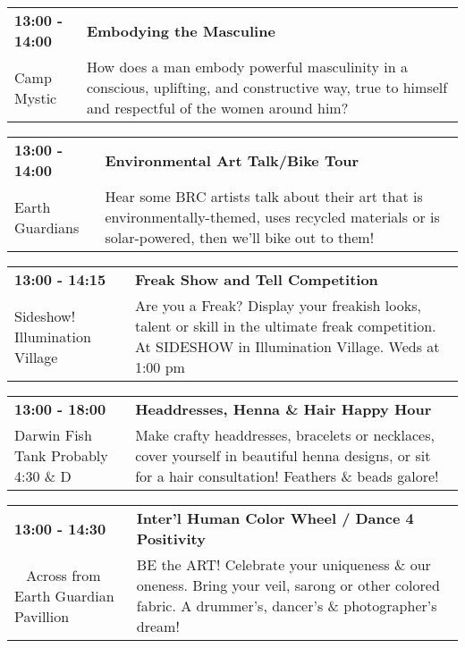 \begin{tabular}{ p{1in} p{2.2in} }
    \textbf{13:00 - 14:00} & \textbf{Embodying the Masculine} \\
    Camp Mystic \newline  & How does a man embody powerful masculinity in a conscious, uplifting, and constructive way, true to himself and respectful of the women around him? \\
    \hline 
\end{tabular}
    
\begin{tabular}{ p{1in} p{2.2in} }
    \textbf{13:00 - 14:00} & \textbf{Environmental Art Talk/Bike Tour} \\
    Earth Guardians \newline  & Hear some BRC artists talk about their art that is environmentally-themed, uses recycled materials or is solar-powered, then we'll bike out to them! \\
    \hline 
\end{tabular}
    
\begin{tabular}{ p{1in} p{2.2in} }
    \textbf{13:00 - 14:15} & \textbf{Freak Show and Tell Competition} \\
    Sideshow! \newline Illumination Village & Are you a Freak? Display your freakish looks, talent or skill in the ultimate freak competition. At SIDESHOW in Illumination Village.  Weds at 1:00 pm \\
    \hline 
\end{tabular}
    
\begin{tabular}{ p{1in} p{2.2in} }
    \textbf{13:00 - 18:00} & \textbf{Headdresses, Henna \& Hair Happy Hour} \\
    Darwin Fish Tank \newline Probably 4:30 \& D & Make crafty headdresses, bracelets or necklaces, cover yourself in beautiful henna designs, or sit for a hair consultation! Feathers \& beads galore! \\
    \hline 
\end{tabular}
    
\begin{tabular}{ p{1in} p{2.2in} }
    \textbf{13:00 - 14:30} & \textbf{Inter'l Human Color Wheel / Dance 4 Positivity} \\
    ~ \newline Across from Earth Guardian Pavillion & BE the ART!  Celebrate your uniqueness \& our oneness. Bring your veil, sarong or other colored fabric. A drummer's, dancer's \& photographer's dream! \\
    \hline 
\end{tabular}
    
